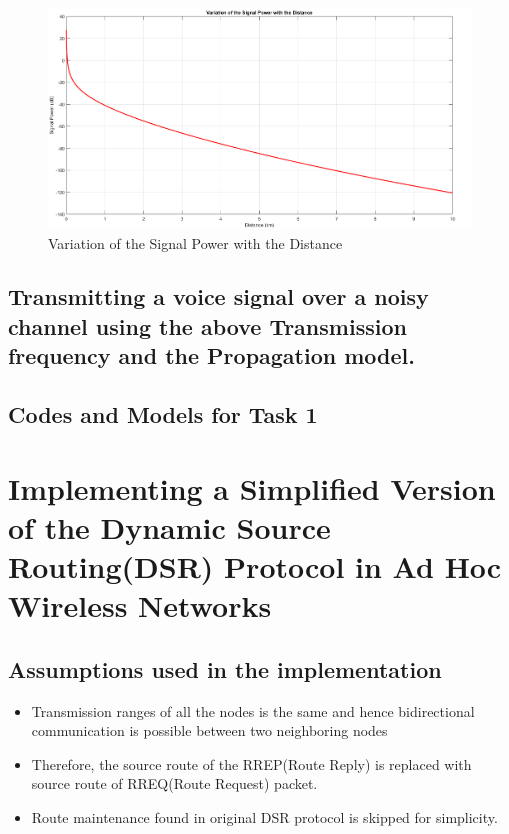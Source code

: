 \documentclass[a4paper,11pt]{article}%
\begin{document}
\begin{figure}[!h]
	\centering
	\includegraphics[scale=0.35]{figures/sp}
	\caption{Variation of the Signal Power with the Distance}
\end{figure}
\pagebreak

\subsection{Transmitting a voice signal over a noisy channel using the above Transmission frequency and the Propagation model.}





\pagebreak
\subsection{Codes and Models for Task 1}




\vfill

\section{Implementing a Simplified Version of the Dynamic Source Routing(DSR) Protocol in Ad Hoc Wireless Networks}
\subsection{Assumptions used in the implementation}
\begin{itemize}
	\item Transmission ranges of all the nodes is the same and hence bidirectional communication is possible between two neighboring nodes
	\item Therefore, the source route of the RREP(Route Reply) is replaced with source route of RREQ(Route Request) packet.
	\item Route maintenance found in original DSR protocol is skipped for simplicity.
\end{itemize}
\end{document}
